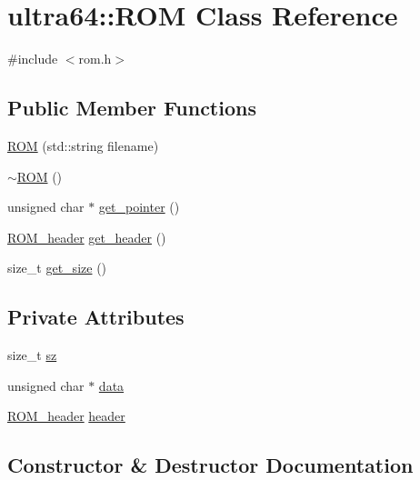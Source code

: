 \hypertarget{classultra64_1_1_r_o_m}{}\section{ultra64\+:\+:R\+OM Class Reference}
\label{classultra64_1_1_r_o_m}


{\ttfamily \#include $<$rom.\+h$>$}

\subsection*{Public Member Functions}
\begin{DoxyCompactItemize}
\item 
\hyperlink{classultra64_1_1_r_o_m_afd9900aa18e0fcc05739e4bff66781d2}{R\+OM} (std\+::string filename)
\item 
\hyperlink{classultra64_1_1_r_o_m_a4ac690b2e2d12bca1ae469580d4b5391}{$\sim$\+R\+OM} ()
\item 
unsigned char $\ast$ \hyperlink{classultra64_1_1_r_o_m_a6f4256c63403739183f9bd29c17903ad}{get\+\_\+pointer} ()
\item 
\hyperlink{structultra64_1_1_r_o_m__header}{R\+O\+M\+\_\+header} \hyperlink{classultra64_1_1_r_o_m_aa171df90056cfb47aabaee332a7b9290}{get\+\_\+header} ()
\item 
size\+\_\+t \hyperlink{classultra64_1_1_r_o_m_af623f78ee86889c872907a0434054506}{get\+\_\+size} ()
\end{DoxyCompactItemize}
\subsection*{Private Attributes}
\begin{DoxyCompactItemize}
\item 
size\+\_\+t \hyperlink{classultra64_1_1_r_o_m_a78f408d8ba2877e67d083268e912de18}{sz}
\item 
unsigned char $\ast$ \hyperlink{classultra64_1_1_r_o_m_a5853bb7a3ce6dbd099ee8477961394ec}{data}
\item 
\hyperlink{structultra64_1_1_r_o_m__header}{R\+O\+M\+\_\+header} \hyperlink{classultra64_1_1_r_o_m_a3d58a7b5227748040408010bcebd1a29}{header}
\end{DoxyCompactItemize}


\subsection{Constructor \& Destructor Documentation}
\mbox{\label{classultra64_1_1_r_o_m_afd9900aa18e0fcc05739e4bff66781d2}} 
